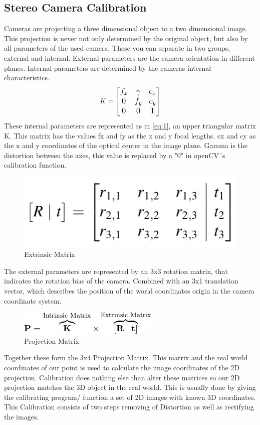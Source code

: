 \documentclass[journal,onecolumn]{IEEEtran}
\begin{document}
\subsection{Stereo Camera Calibration}
\noindent
Cameras are projecting a three dimensional object to a two dimensional image. This projection is never not only determined by the original object, but also by all parameters of the used camera. These you can separate in two groups, external and internal. External parameters are the camera orientation in different planes. Internal parameters are determined by the cameras internal characteristics.
\begin{equation} \label{eq:1}
\large
K = 
\begin{bmatrix}
 f_x & \gamma & c_x \\
 0 & f_y & c_y \\
 0 & 0 & 1 
\end{bmatrix}
\end{equation}
\noindent
These internal parameters are represented as in \ref{eq:1}, an upper triangular matrix K. This matrix has the values fx and fy as the x and y focal lengths. cx and cy as the x and y coordinates of the optical center in the image plane. Gamma is the distortion between the axes, this value is replaced by a "0" in openCV´s calibration function.\newline

\begin{figure}[H]
	\centering
	\includegraphics[scale=0.4]{extrinsicMatrix.png}
	\captionsetup{justification=centering}
	\caption{Extrinsic Matrix}
\end{figure}
\noindent
The external parameters are represented by an 3x3 rotation matrix, that indicates the rotation bias of the camera. Combined with an 3x1 translation vector, which describes the position of the world coordinates origin in the camera coordinate system.\newline
\begin{figure}[H]
	\centering
	\includegraphics[scale=0.7]{projectionMatrix.png}
	\captionsetup{justification=centering}
	\caption{Projection Matrix}
\end{figure}
\noindent
Together these form the 3x4 Projection Matrix. This matrix and the real world coordinates of our point is used to calculate the image coordinates of the 2D projection. Calibration does nothing else than alter these matrices so our 2D projection matches the 3D object in the real world. This is usually done by giving the calibrating program/ function a set of 2D images with known 3D coordinates.
This Calibration consists of two steps removing of Distortion as well as rectifying the images\cite{ImageRectification}. \newline
\end{document}

